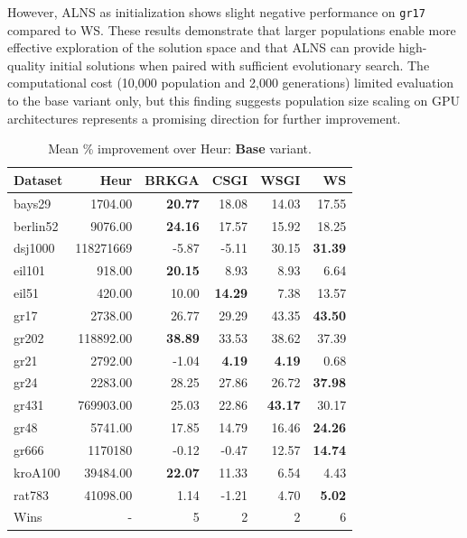 \documentclass[sigconf]{acmart}
\begin{document}
However, ALNS as initialization shows slight negative performance on \texttt{gr17} compared to WS. These results demonstrate that larger populations enable more effective exploration of the solution space and that ALNS can provide high-quality initial solutions when paired with sufficient evolutionary search. The computational cost (10,000 population and 2,000 generations) limited evaluation to the base variant only, but this finding suggests population size scaling on GPU architectures represents a promising direction for further improvement.

\begin{table}[t]
\centering
\caption{Mean \% improvement over Heur: \textbf{Base} variant.}
\label{tab:base}
\small
\begin{tabular}{lrrrrr}
\toprule
Dataset & Heur & BRKGA & CSGI & WSGI & WS \\
\midrule
bays29 & 1704.00 & \textbf{20.77} & 18.08 & 14.03 & 17.55 \\
berlin52 & 9076.00 & \textbf{24.16} & 17.57 & 15.92 & 18.25 \\
dsj1000 & 118271669 & -5.87 & -5.11 & 30.15 & \textbf{31.39} \\
eil101 & 918.00 & \textbf{20.15} & 8.93 & 8.93 & 6.64 \\
eil51 & 420.00 & 10.00 & \textbf{14.29} & 7.38 & 13.57 \\
gr17 & 2738.00 & 26.77 & 29.29 & 43.35 & \textbf{43.50} \\
gr202 & 118892.00 & \textbf{38.89} & 33.53 & 38.62 & 37.39 \\
gr21 & 2792.00 & -1.04 & \textbf{4.19} & \textbf{4.19} & 0.68 \\
gr24 & 2283.00 & 28.25 & 27.86 & 26.72 & \textbf{37.98} \\
gr431 & 769903.00 & 25.03 & 22.86 & \textbf{43.17} & 30.17 \\
gr48 & 5741.00 & 17.85 & 14.79 & 16.46 & \textbf{24.26} \\
gr666 & 1170180 & -0.12 & -0.47 & 12.57 & \textbf{14.74} \\
kroA100 & 39484.00 & \textbf{22.07} & 11.33 & 6.54 & 4.43 \\
rat783 & 41098.00 & 1.14 & -1.21 & 4.70 & \textbf{5.02} \\
\midrule
Wins & - & 5 & 2 & 2 & 6 \\
\bottomrule
\end{tabular}
\end{table}
\end{document}
